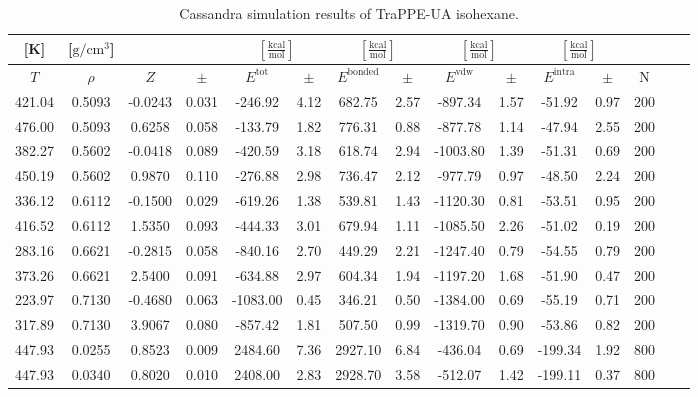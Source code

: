 \documentclass[%
 aip,
 jcp,
 sd,%
 amsmath,amssymb,
]{revtex4-1}
\begin{document}
\begin{table*}[!htbp]
\centering
\caption{Cassandra simulation results of TraPPE-UA isohexane.}
\label{tab:sim-res-TraPPE-iC6}
\begin{ruledtabular}
\begin{tabular}{ccccccccccccccc}
[K] & [$\mathrm{g/cm^3}$] &  &  & \multicolumn{2}{c}{$[\frac{\mathrm{kcal}}{\mathrm{mol}}]$} & \multicolumn{2}{c}{$[\frac{\mathrm{kcal}}{\mathrm{mol}}]$} & \multicolumn{2}{c}{$[\frac{\mathrm{kcal}}{\mathrm{mol}}]$} &\multicolumn{2}{c}{$[\frac{\mathrm{kcal}}{\mathrm{mol}}]$} & \\
\hline
$T$ & $\rho$ & $Z$ & $\pm$ & $E^{\mathrm{tot}}$ & $\pm$ & $E^{\mathrm{bonded}}$ & $\pm$ & $E^{\mathrm{vdw}}$ & $\pm$ & $E^{\mathrm{intra}}$ & $\pm$ & N\\
\hline
421.04	&	0.5093	&	-0.0243	&	0.031	&	-246.92	&	4.12	&	682.75	&	2.57	&	-897.34	&	1.57	&	-51.92	&	0.97	&	200	\\
476.00	&	0.5093	&	0.6258	&	0.058	&	-133.79	&	1.82	&	776.31	&	0.88	&	-877.78	&	1.14	&	-47.94	&	2.55	&	200	\\
382.27	&	0.5602	&	-0.0418	&	0.089	&	-420.59	&	3.18	&	618.74	&	2.94	&	-1003.80	&	1.39	&	-51.31	&	0.69	&	200	\\
450.19	&	0.5602	&	0.9870	&	0.110	&	-276.88	&	2.98	&	736.47	&	2.12	&	-977.79	&	0.97	&	-48.50	&	2.24	&	200	\\
336.12	&	0.6112	&	-0.1500	&	0.029	&	-619.26	&	1.38	&	539.81	&	1.43	&	-1120.30	&	0.81	&	-53.51	&	0.95	&	200	\\
416.52	&	0.6112	&	1.5350	&	0.093	&	-444.33	&	3.01	&	679.94	&	1.11	&	-1085.50	&	2.26	&	-51.02	&	0.19	&	200	\\
283.16	&	0.6621	&	-0.2815	&	0.058	&	-840.16	&	2.70	&	449.29	&	2.21	&	-1247.40	&	0.79	&	-54.55	&	0.79	&	200	\\
373.26	&	0.6621	&	2.5400	&	0.091	&	-634.88	&	2.97	&	604.34	&	1.94	&	-1197.20	&	1.68	&	-51.90	&	0.47	&	200	\\
223.97	&	0.7130	&	-0.4680	&	0.063	&	-1083.00	&	0.45	&	346.21	&	0.50	&	-1384.00	&	0.69	&	-55.19	&	0.71	&	200	\\
317.89	&	0.7130	&	3.9067	&	0.080	&	-857.42	&	1.81	&	507.50	&	0.99	&	-1319.70	&	0.90	&	-53.86	&	0.82	&	200	\\
447.93	&	0.0255	&	0.8523	&	0.009	&	2484.60	&	7.36	&	2927.10	&	6.84	&	-436.04	&	0.69	&	-199.34	&	1.92	&	800	\\
447.93	&	0.0340	&	0.8020	&	0.010	&	2408.00	&	2.83	&	2928.70	&	3.58	&	-512.07	&	1.42	&	-199.11	&	0.37	&	800	\\

\end{tabular}
\end{ruledtabular}
\end{table*}
\end{document}
